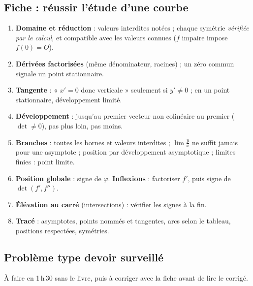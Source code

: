 \documentclass[a4paper,11pt]{article}
\numberwithin{equation}{section}
\numberwithin{figure}{section}
\numberwithin{table}{section}
\theoremstyle{enonce}
\theoremstyle{exemple}
\theoremstyle{remarque}
\begin{document}
\subsection{Fiche : réussir l'étude d'une courbe}

\begin{tcolorbox}[enhanced,breakable,colback=white,colframe=Bleu,boxrule=0.6pt,arc=0pt,left=10pt,right=10pt,top=6pt,bottom=6pt]
\label{fiche:courbe}
\begin{enumerate}[leftmargin=1.4em,itemsep=0.25em]
\item \textbf{Domaine et réduction} : valeurs interdites notées ; chaque symétrie \emph{vérifiée par le calcul}, et compatible
      avec les valeurs connues ($f$ impaire impose $f(0)=O$).
\item \textbf{Dérivées factorisées} (même dénominateur, racines) ; un zéro commun signale un point stationnaire.
\item \textbf{Tangente} : « $x'=0$ donc verticale » seulement si $y'\neq0$ ; en un point stationnaire, développement limité.
\item \textbf{Développement} : jusqu'au premier vecteur non colinéaire au premier ($\det\neq0$), pas plus loin, pas moins.
\item \textbf{Branches} : toutes les bornes et valeurs interdites ; $\lim\frac yx$ ne suffit jamais pour une asymptote ; position par
      développement asymptotique ; limites finies : point limite.
\item \textbf{Position globale} : signe de $\varphi$. \textbf{Inflexions} : factoriser $f'$, puis signe de $\det(f',f'')$.
\item \textbf{Élévation au carré} (intersections) : vérifier les signes à la fin.
\item \textbf{Tracé} : asymptotes, points nommés et tangentes, arcs selon le tableau, positions respectées, symétries.
\end{enumerate}
\end{tcolorbox}

\subsection{Problème type devoir surveillé}

À faire en 1\,h\,30 sans le livre, puis à corriger avec la fiche avant de lire le corrigé.
\end{document}
